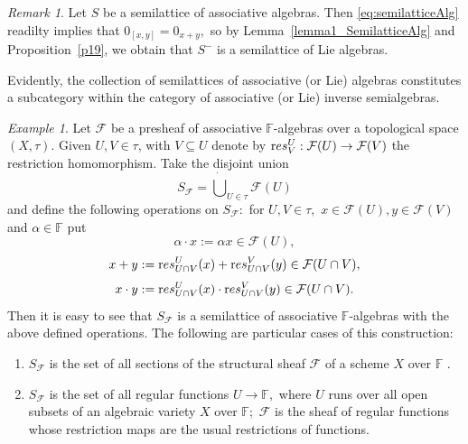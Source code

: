 \documentclass{amsart}
\newcommand{\0}{{\vartheta}}
\theoremstyle{definition}
\theoremstyle{remark}
\newtheorem{rem}[thm]{Remark}
\newtheorem{ex}[thm]{Example}
\numberwithin{equation}{section}
\newtheorem*{Theorem A}{\textbf{Theorem A}}
\newtheorem*{Corollary E}{\textbf{Corollary E}}
\newtheorem*{Corollary F}{\textbf{Corollary F}}
\newtheorem*{Theorem B}{\textbf{Theorem B}}
\newtheorem*{Theorem C}{\textbf{Theorem C}}
\newtheorem*{Theorem D}{\textbf{Theorem B}}
\newtheorem*{p a}{\textbf{Proof of  Theorem A}}
\newtheorem*{p b}{\textbf{Proof of Theorem B}}
\newtheorem*{p c}{\textbf{Proof of  Theorem C}}
\newtheorem*{p d}{\textbf{Proof of  Theorem D}}
\begin{document}
\begin{rem}\label{rem:AssocToLieSamillatAlg} Let  $S$ be a semilattice of associative algebras. Then 
 \eqref{eq:semilatticeAlg} readilty implies that  
 $0_{[x,y]} = 0_{x + y},$ so by 
 Lemma~\ref{lemma1_SemilatticeAlg} and  
 Proposition~\ref{p19}, we obtain that  $S^-$ is a semilattice of Lie algebras. 
\end{rem}

Evidently, the collection of semilattices of associative (or Lie) algebras constitutes a subcategory within the category of associative (or Lie) inverse semialgebras. 


\begin{ex}\label{example:Sheaves}
 Let $\mathcal F$ be a presheaf of associative $\mathbb{F}$-algebras over a topological space $(X, \tau).$  Given $U,V \in \tau$, with $V \subseteq U$ denote by  
${\textrm res}^U _{V}: \mathcal F (U) \to \mathcal F  (V)$ the restriction homomorphism. Take the  disjoint union
$$S_{\mathcal F} =    \dot{\bigcup}  _{U \in \tau} \mathcal F (U) $$ and define  the  following operations on $S_{\mathcal F}:$ for $U,V \in \tau ,$  $x\in \mathcal F (U), y \in \mathcal F (V)$ and  $\alpha \in \mathbb{F} $ put
$$\alpha \cdot x :=  
 \alpha  x \in {\mathcal F}(U),$$
 $$x+y :=  {\textrm res}^U _{U\cap V}(x) + 
 {\textrm res}^V _{U\cap V} (y) \in {\mathcal F}(U\cap V),$$
 $$x \cdot y :=  {\textrm res}^U _{U\cap V}(x) \cdot 
 {\textrm res}^V _{U\cap V} (y)\in {\mathcal F}(U\cap V).$$ Then it is easy to see that  $S_{\mathcal F} $  is a semilattice of associative $\mathbb{F}$-algebras with the above defined operations.
    The following are  particular cases of this construction: 
\begin{enumerate}
\item $S_{\mathcal F}$ is the  set  of all sections of the structural sheaf ${\mathcal F}$ of a scheme $X$ over  $\mathbb{F}$ .\\

\item  $S_{\mathcal F}$ is the  set  of all regular functions $U \to \mathbb{F},$ where $U$ runs over all open subsets of an algebraic variety $X$ over   $\mathbb{F};$ ${\mathcal F}$ is the sheaf of regular functions whose restriction maps are the usual restrictions of functions. \\


\end{enumerate}
\end{ex}
\end{document}
